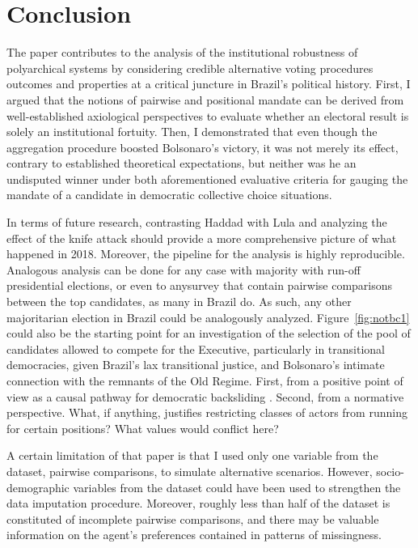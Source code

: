 \documentclass[hidelinks,11pt]{article} \usepackage[utf8]{inputenc}
\begin{document}
\section{Conclusion}

The paper contributes to the analysis of the institutional robustness of
polyarchical systems by considering credible alternative voting procedures
outcomes and properties at a critical juncture in Brazil's political history.
First, I argued that the notions of pairwise and positional mandate can be
derived from well-established axiological perspectives to evaluate whether an
electoral result is solely an institutional fortuity. Then, I demonstrated that
even though the aggregation procedure boosted Bolsonaro's victory, it was not
merely its effect, contrary to established theoretical expectations, but neither
was he an undisputed winner under both aforementioned evaluative criteria for
gauging the mandate of a candidate in democratic collective choice situations.

In terms of future research, contrasting Haddad with Lula and analyzing the
effect of the knife attack should provide a more comprehensive picture of what
happened in 2018. Moreover, the pipeline for the analysis is highly
reproducible. Analogous analysis can be done for any case with majority with run-off presidential elections, or even to anysurvey that contain pairwise comparisons
between the top candidates, as many in Brazil do. As such, any other
majoritarian election in Brazil could be analogously analyzed.
Figure~\ref{fig:notbc1} could also be the starting point for an investigation of
the selection of the pool of candidates allowed to compete for the Executive,
particularly in transitional democracies, given Brazil's lax transitional
justice, and Bolsonaro's intimate connection with the remnants of the Old
Regime. First, from a positive point of view as a causal pathway for democratic
backsliding \parencite{svolik2008authoritarian, nalepa2022after}. Second, from a
normative perspective. What, if anything, justifies restricting classes of
actors from running for certain positions? What values would conflict here?

A certain limitation of that paper is that I used only one variable from
the dataset, pairwise comparisons, to simulate alternative scenarios. However,
socio-demographic variables from the dataset could have been used to strengthen
the data imputation procedure. Moreover, roughly less than half of the dataset
is constituted of incomplete pairwise comparisons, and there may be valuable
information on the agent's preferences contained in patterns of missingness.
\end{document}
